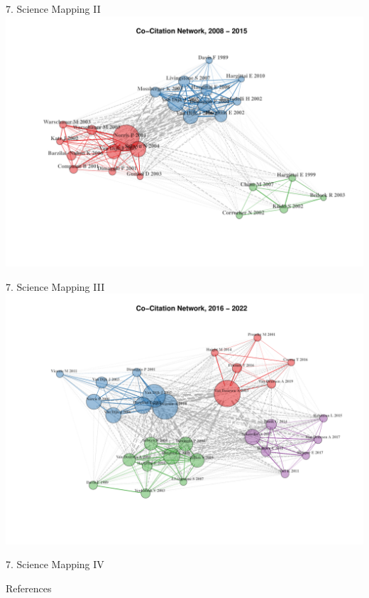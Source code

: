 \documentclass[
  ignorenonframetext,
]{beamer}
\newif\ifbibliography
\begin{document}
\begin{frame}{7. Science Mapping II}
\protect\hypertarget{science-mapping-ii}{}
\includegraphics{Presentation_bibliometric_files/figure-beamer/Co_cite_P2-1.pdf}
\end{frame}

\begin{frame}{7. Science Mapping III}
\protect\hypertarget{science-mapping-iii}{}
\includegraphics{Presentation_bibliometric_files/figure-beamer/Co_cite_P3-1.pdf}
\end{frame}

\begin{frame}{7. Science Mapping IV}
\protect\hypertarget{science-mapping-iv}{}
\end{frame}

\renewcommand\refname{References}
\begin{frame}[allowframebreaks]{References}
  \bibliographytrue
  
\end{frame}
\end{document}
